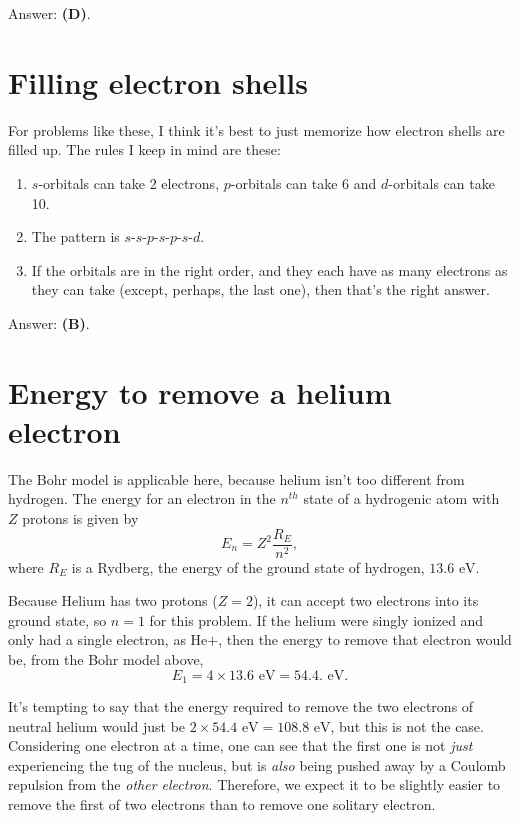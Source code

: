 \documentclass[11pt]{paper}
\newcommand{\answer}[1]{Answer: \textbf{(#1)}.}
\begin{document}
\answer{D}

\section{Filling electron shells}
For problems like these, I think it's best to just memorize how electron shells are filled up.  The rules I keep in mind are these:
\begin{enumerate}
\item $s$-orbitals can take 2 electrons, $p$-orbitals can take 6 and $d$-orbitals can take 10.
\item The pattern is $s$-$s$-$p$-$s$-$p$-$s$-$d$.
\item If the orbitals are in the right order, and they each have as many electrons as they can take (except, perhaps, the last one), then that's the right answer.
\end{enumerate}

\answer{B}

\section{Energy to remove a helium electron}
The Bohr model is applicable here, because helium isn't too different from hydrogen.  The energy for an electron in the $n^{th}$ state of a hydrogenic atom with $Z$ protons is given by
\begin{equation}
E_n = Z^2 \frac{R_E}{n^2},
\end{equation}
where $R_E$ is a Rydberg, the energy of the ground state of hydrogen, $13.6\text{ eV}$.

Because Helium has two protons ($Z=2$), it can accept two electrons into its ground state, so $n = 1$ for this problem.  If the helium were singly ionized and only had a single electron, as $\text{He+}$, then the energy to remove that electron would be, from the Bohr model above,
\begin{equation}
E_1 = 4 \times 13.6 \text{ eV} = 54.4.\text{ eV}.
\end{equation}

It's tempting to say that the energy required to remove the two electrons of neutral helium would just be $2 \times 54.4 \text{ eV} = 108.8 \text{ eV}$, but this is not the case.  Considering one electron at a time, one can see that the first one is not \emph{just} experiencing the tug of the nucleus, but is \emph{also} being pushed away by a Coulomb repulsion from the \emph{other electron}.  Therefore, we expect it to be slightly easier to remove the first of two electrons than to remove one solitary electron.
\end{document}
